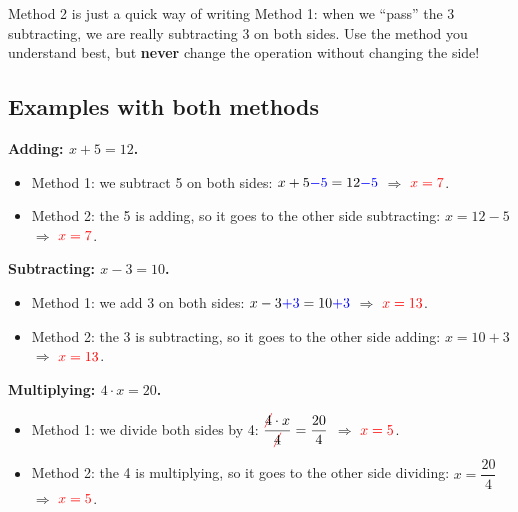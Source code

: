 \begin{impt}
    Method 2 is just a quick way of writing Method 1: when we ``pass'' the 3 subtracting, we are really subtracting 3 on both sides. Use the method you understand best, but \textbf{never} change the operation without changing the side!
\end{impt}

\subsection{Examples with both methods}

\begin{example}
    \textbf{Adding: \(x + 5 = 12\).}
    \begin{itemize}
        \item Method 1: we subtract 5 on both sides: \(x + 5 \textcolor{blue}{- 5} = 12 \textcolor{blue}{- 5}\) \(\Rightarrow\) \(\textcolor{red}{x = 7}\).
        \item Method 2: the 5 is adding, so it goes to the other side subtracting: \(x = 12 - 5\) \(\Rightarrow\) \(\textcolor{red}{x = 7}\).
    \end{itemize}
\end{example}

\begin{example}
    \textbf{Subtracting: \(x - 3 = 10\).}
    \begin{itemize}
        \item Method 1: we add 3 on both sides: \(x - 3 \textcolor{blue}{+ 3} = 10 \textcolor{blue}{+ 3}\) \(\Rightarrow\) \(\textcolor{red}{x = 13}\).
        \item Method 2: the 3 is subtracting, so it goes to the other side adding: \(x = 10 + 3\) \(\Rightarrow\) \(\textcolor{red}{x = 13}\).
    \end{itemize}
\end{example}

\begin{example}
    \textbf{Multiplying: \(4 \cdot x = 20\).}
    \begin{itemize}
        \item Method 1: we divide both sides by 4: \(\dfrac{\cancelred{4} \cdot x}{\cancelred{4}} = \dfrac{20}{4}\) \(\Rightarrow\) \(\textcolor{red}{x = 5}\).
        \item Method 2: the 4 is multiplying, so it goes to the other side dividing: \(x = \dfrac{20}{4}\) \(\Rightarrow\) \(\textcolor{red}{x = 5}\).
    \end{itemize}
\end{example}


